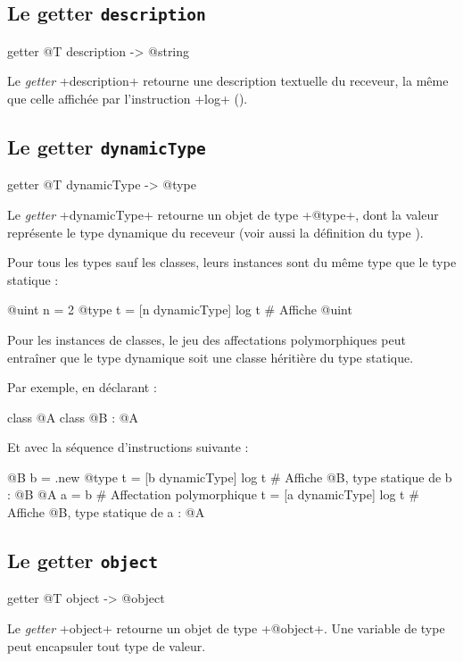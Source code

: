 \subsection{Le getter \texttt{description}}

\begin{galgascode}
getter @T description -> @string
\end{galgascode}

Le \emph{getter} \ggs+description+ retourne une description textuelle du receveur, la même que celle affichée par l'instruction \ggs+log+ ().



\subsection{Le getter \texttt{dynamicType}}

\begin{galgascode}
getter @T dynamicType -> @type
\end{galgascode}

Le \emph{getter} \ggs+dynamicType+ retourne un objet de type \ggs+@type+, dont la valeur représente le type dynamique du receveur (voir aussi la définition du type ).

Pour tous les types sauf les classes, leurs instances sont du même type que le type statique :

\begin{galgascode}
@uint n = 2
@type t = [n dynamicType]
log t # Affiche @uint
\end{galgascode}

Pour les instances de classes, le jeu des affectations polymorphiques peut entraîner que le type dynamique soit une classe héritière du type statique.

Par exemple, en déclarant :
\begin{galgascode}
class @A { }
class @B : @A { }
\end{galgascode}

Et avec la séquence d'instructions suivante :
\begin{galgascode}
@B b = .new
@type t = [b dynamicType]
log t # Affiche @B, type statique de b : @B
@A a = b # Affectation polymorphique
t = [a dynamicType]
log t # Affiche @B, type statique de a : @A
\end{galgascode}





\subsection{Le getter \texttt{object}}

\begin{galgascode}
getter @T object -> @object
\end{galgascode}


Le \emph{getter} \ggs+object+ retourne un objet de type \ggs+@object+. Une variable de type  peut encapsuler tout type de valeur.


